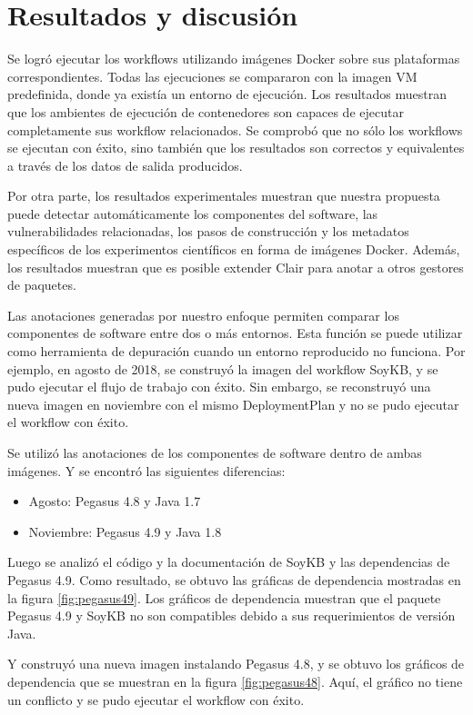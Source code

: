     
\section{Resultados y discusión}\label{s5.4}
Se logró ejecutar los workflows utilizando imágenes Docker sobre sus plataformas correspondientes.
Todas las ejecuciones se compararon con la imagen VM predefinida, donde ya existía un entorno de ejecución. Los resultados muestran que los ambientes de ejecución de contenedores son capaces de ejecutar completamente sus workflow relacionados. Se  comprobó que no sólo los workflows se ejecutan con éxito, sino también que los resultados son correctos y equivalentes a través de los datos de salida producidos. 

Por otra parte, los resultados experimentales muestran que nuestra propuesta puede detectar automáticamente los componentes del software, las vulnerabilidades relacionadas, los pasos de construcción y los metadatos específicos de los experimentos científicos en forma de imágenes Docker. 
Además, los resultados muestran que es posible extender Clair para anotar a otros gestores de paquetes. 

Las anotaciones generadas por nuestro enfoque permiten comparar los componentes de software entre dos o más entornos. Esta función se puede utilizar como herramienta de depuración cuando un entorno reproducido no funciona.
Por ejemplo, en agosto de 2018, se construyó la imagen del workflow SoyKB, y se pudo ejecutar el flujo de trabajo con éxito. Sin embargo, se reconstruyó una nueva imagen en noviembre con el mismo DeploymentPlan y no se pudo ejecutar el workflow con éxito.


Se utilizó las anotaciones de los componentes de software dentro de ambas imágenes. Y se encontró las siguientes diferencias:
\begin{itemize}
    \item Agosto: Pegasus 4.8 y Java 1.7
    \item Noviembre: Pegasus 4.9 y Java 1.8
\end{itemize}

Luego se analizó el código y la documentación de SoyKB y las dependencias de Pegasus 4.9. Como resultado, se obtuvo las gráficas de dependencia mostradas en la figura \ref{fig:pegasus49}.  Los gráficos de dependencia muestran que el paquete Pegasus 4.9 y SoyKB no son compatibles debido a sus requerimientos de versión Java.

Y construyó una nueva imagen instalando Pegasus 4.8, y se obtuvo los gráficos de dependencia que se muestran en la figura \ref{fig:pegasus48}. Aquí, el gráfico no tiene un conflicto y se pudo ejecutar el workflow con éxito.


